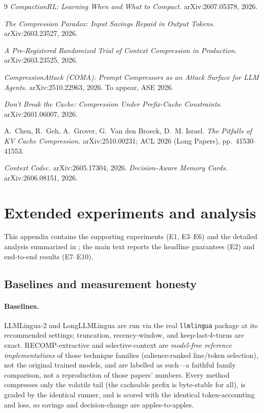 \documentclass{article}
\begin{document}
\begin{thebibliography}{9}
 \emph{CompactionRL: Learning When and What to Compact.}
arXiv:2607.05378, 2026.

 \emph{The Compression Paradox: Input Savings Repaid in Output
Tokens.} arXiv:2603.23527, 2026.

 \emph{A Pre-Registered Randomized Trial of Context Compression in
Production.} arXiv:2603.23525, 2026.

 \emph{CompressionAttack (COMA): Prompt Compressors as an Attack Surface for
LLM Agents.} arXiv:2510.22963, 2026. To appear, ASE 2026.

 \emph{Don't Break the Cache: Compression Under Prefix-Cache
Constraints.} arXiv:2601.06007, 2026.

 A.~Chen, R.~Geh, A.~Grover, G.~Van den Broeck, D.~M. Israel.
\emph{The Pitfalls of KV Cache Compression.} arXiv:2510.00231; ACL 2026 (Long Papers),
pp.~41530--41553.

 \emph{Context Codec.} arXiv:2605.17304, 2026.
 \emph{Decision-Aware Memory Cards.} arXiv:2606.08151, 2026.
\end{thebibliography}

\appendix
\section{Extended experiments and analysis}
\label{app:extended}
This appendix contains the supporting experiments (E1, E3--E6) and the detailed analysis summarized in ; the main text reports the headline guarantees (E2) and end-to-end results (E7--E10).


\subsection{Baselines and measurement honesty}
\paragraph{Baselines.} LLMLingua-2 and LongLLMLingua are run via the real
\texttt{llmlingua} package at its recommended settings; truncation, recency-window,
and keep-last-$k$-turns are exact. RECOMP-extractive and selective-context are
\emph{model-free reference implementations} of those technique families (salience-ranked
line/token selection), not the original trained models, and are labelled as such---a
faithful family comparison, not a reproduction of those papers' numbers. Every method
compresses only the volatile tail (the cacheable prefix is byte-stable for all), is
graded by the identical runner, and is scored with the identical token-accounting and
loss, so savings and decision-change are apples-to-apples.
\end{document}
